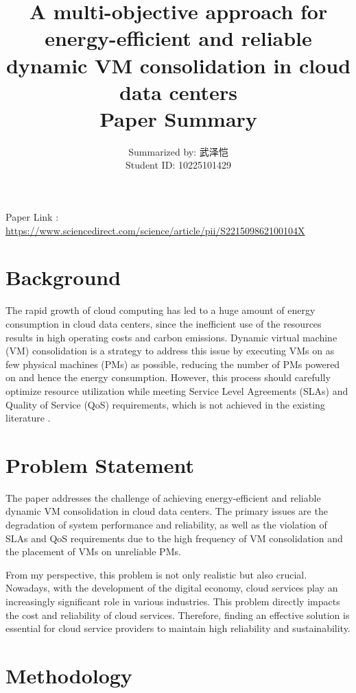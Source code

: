 \documentclass[UTF8, fontset=windows]{article}
\title{A multi-objective approach for energy-efficient and reliable dynamic VM
consolidation in cloud data centers \large \\Paper Summary}
\author{Summarized by: 武泽恺\\
  \small Student ID: 10225101429\\
}
\date{\vspace{-5ex}}
\begin{document}
\maketitle

\noindent Paper Link \cite{sayadnavard2022multi}: {\url{https://www.sciencedirect.com/science/article/pii/S221509862100104X}}

\section{Background}

The rapid growth of cloud computing has led to a huge amount of energy consumption in cloud data centers, since the inefficient use of the resources results in high operating costs and carbon emissions. Dynamic virtual machine (VM) consolidation is a strategy to address this issue by executing VMs on as few physical machines (PMs) as possible, reducing the number of PMs powered on and hence the energy consumption. However, this process should carefully optimize resource utilization while meeting Service Level Agreements (SLAs) and Quality of Service (QoS) requirements, which is not achieved in the existing literature \cite{beloglazov2012managing,li2017bayesian,zhang2015burstiness,mahdhi2018prediction,ponraj2019optimistic,shen2018compvm,speitkamp2010mathematical}.

\section{Problem Statement}

The paper addresses the challenge of achieving energy-efficient and reliable dynamic VM consolidation in cloud data centers. The primary issues are the degradation of system performance and reliability, as well as the violation of SLAs and QoS requirements due to the high frequency of VM consolidation and the placement of VMs on unreliable PMs.

From my perspective, this problem is not only realistic but also crucial. Nowadays, with the development of the digital economy, cloud services play an increasingly significant role in various industries. This problem directly impacts the cost and reliability of cloud services. Therefore, finding an effective solution is essential for cloud service providers to maintain high reliability and sustainability.

\section{Methodology}
\end{document}
